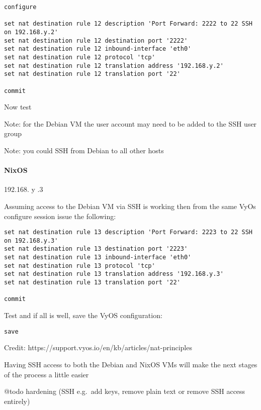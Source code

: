 \begin{verbatim}
configure

set nat destination rule 12 description 'Port Forward: 2222 to 22 SSH on 192.168.y.2'
set nat destination rule 12 destination port '2222'
set nat destination rule 12 inbound-interface 'eth0'
set nat destination rule 12 protocol 'tcp'
set nat destination rule 12 translation address '192.168.y.2'
set nat destination rule 12 translation port '22'

commit
\end{verbatim}

Now test

Note: for the Debian VM the user account may need to be added to the SSH
user group

Note: you could SSH from Debian to all other hosts

\hypertarget{nixos}{%
\paragraph{NixOS}\label{nixos}}

192.168. y .3

Assuming access to the Debian VM via SSH is working then from the same
VyOs configure session issue the following:

\begin{verbatim}
set nat destination rule 13 description 'Port Forward: 2223 to 22 SSH on 192.168.y.3'
set nat destination rule 13 destination port '2223'
set nat destination rule 13 inbound-interface 'eth0'
set nat destination rule 13 protocol 'tcp'
set nat destination rule 13 translation address '192.168.y.3'
set nat destination rule 13 translation port '22'

commit
\end{verbatim}

Test and if all is well, save the VyOS configuration:

\begin{verbatim}
save
\end{verbatim}

Credit: https://support.vyos.io/en/kb/articles/nat-principles

Having SSH access to both the Debian and NixOS VMs will make the next
stages of the process a little easier

@todo hardening (SSH e.g.~add keys, remove plain text or remove SSH
access entirely)
